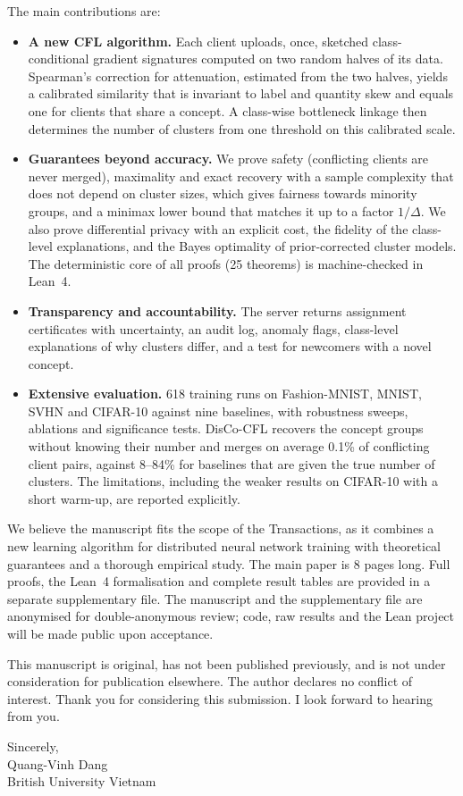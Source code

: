 \documentclass[10pt]{article}
\begin{document}
The main contributions are:
\begin{itemize}
\item \textbf{A new CFL algorithm.} Each client uploads, once, sketched class-conditional gradient signatures computed on two random halves of its data. Spearman's correction for attenuation, estimated from the two halves, yields a calibrated similarity that is invariant to label and quantity skew and equals one for clients that share a concept. A class-wise bottleneck linkage then determines the number of clusters from one threshold on this calibrated scale.
\item \textbf{Guarantees beyond accuracy.} We prove safety (conflicting clients are never merged), maximality and exact recovery with a sample complexity that does not depend on cluster sizes, which gives fairness towards minority groups, and a minimax lower bound that matches it up to a factor $1/\Delta$. We also prove differential privacy with an explicit cost, the fidelity of the class-level explanations, and the Bayes optimality of prior-corrected cluster models. The deterministic core of all proofs (25 theorems) is machine-checked in Lean~4.
\item \textbf{Transparency and accountability.} The server returns assignment certificates with uncertainty, an audit log, anomaly flags, class-level explanations of why clusters differ, and a test for newcomers with a novel concept.
\item \textbf{Extensive evaluation.} 618 training runs on Fashion-MNIST, MNIST, SVHN and CIFAR-10 against nine baselines, with robustness sweeps, ablations and significance tests. DisCo-CFL recovers the concept groups without knowing their number and merges on average 0.1\% of conflicting client pairs, against 8--84\% for baselines that are given the true number of clusters. The limitations, including the weaker results on CIFAR-10 with a short warm-up, are reported explicitly.
\end{itemize}

We believe the manuscript fits the scope of the Transactions, as it combines a new learning algorithm for distributed neural network training with theoretical guarantees and a thorough empirical study. The main paper is 8 pages long. Full proofs, the Lean~4 formalisation and complete result tables are provided in a separate supplementary file. The manuscript and the supplementary file are anonymised for double-anonymous review; code, raw results and the Lean project will be made public upon acceptance.

This manuscript is original, has not been published previously, and is not under consideration for publication elsewhere. The author declares no conflict of interest. Thank you for considering this submission. I look forward to hearing from you.

Sincerely,\\[0.8em]
Quang-Vinh Dang\\
British University Vietnam
\end{document}

